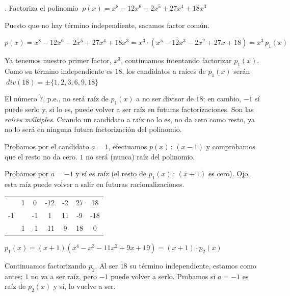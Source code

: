 \vspace{5mm}
\begin{miejemplo}
. Factoriza el polinomio $\ p(x)=x^8-12x^6-2x^5+27x^4+18x^3$

\vspace{5mm} Puesto que no hay término independiente, sacamos factor común.

\vspace{2mm} $p(x)=x^8-12x^6-2x^5+27x^4+18x^3=x^3\cdot(x^5-12x^3-2x^2+27x+18)=x^3\, p_1(x)$

\vspace{2mm} Ya tenemos nuestro primer factor, $x^3$, continuamos intentando factorizar $p_1(x)$. Como su término independiente es $18$, los candidatos a raíces de $p_1(x)$ serán $\ div(18)=\pm\{1,2,3,6,9,18\}$ 

\vspace{2mm} El número $7$, p.e., no será raíz de $p_1(x)$ a no ser divisor de $18$; en cambio, $-1$ sí puede serlo y, si lo es, puede volver a ser raíz en futuras factorizaciones. Son las \emph{raíces múltiples}. Cuando un candidato a raíz no lo es, no da cero como resto, ya no lo será en ninguna futura factorización del polinomio.

\vspace{2mm}  Probamos por el candidato $a=1$, efectuamos $p(x)\, : \, (x-1)$ y comprobamos que el resto no da cero. $1$ no será (nunca) raíz del polinomio.

\vspace{2mm} Probamos por $a=-1$ y sí es raíz (el resto de $p_1(x)\, :\, (x+1)$ es cero). \underline{Ojo},  esta raíz puede volver a salir en futuras racionalizaciones.

\begin{multicols}{2}
\begin{table}[H]
\centering
\begin{tabular}{c|cccccc}
 & 1 & 0 & -12 & -2 & 27 & 18 \\
-1 &  & -1 & 1 & 11 & -9 & -18 \\ \hline
 & 1 & -1 & -11 & 9 & \multicolumn{1}{c|}{18} & 0 \\ \cline{7-7} 
\end{tabular}
\end{table}
$p_1(x)=(x+1)(x^4-x^3-11x^2+9x+19)=(x+1)\cdot p_2(x)$
\end{multicols}

\vspace{2mm} Continuamos factorizando $p_2$. Al ser $18$ su término independiente, estamos como antes: $1$ no va a ser raíz, pero $-1$ puede volver a serlo. Probamos si $a=-1$ es raíz de $p_2(x)$ y sí, lo vuelve a ser.


\end{miejemplo}
